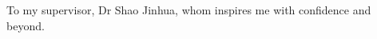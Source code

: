 \begin{acknowledgments}
To my supervisor, Dr Shao Jinhua, whom inspires me with confidence and beyond.
\end{acknowledgments}